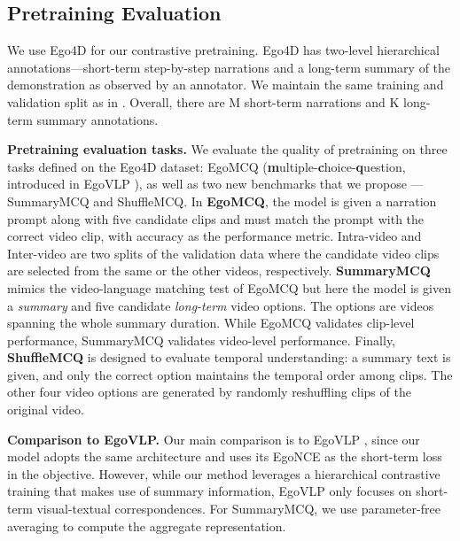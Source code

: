 \documentclass[10pt,twocolumn,letterpaper]{article}
\begin{document}
\subsection{Pretraining Evaluation}
\label{sec:exp-evaluation}

We use Ego4D \cite{ego4d,ego4dcons} for our contrastive pretraining. Ego4D has two-level hierarchical annotations---short-term step-by-step narrations and a long-term summary of the demonstration as observed by an annotator. We maintain the same training and validation split as in \cite{egovlp}. Overall, there are M short-term narrations and K long-term summary annotations. 

\noindent \textbf{Pretraining evaluation tasks.}
We evaluate the quality of pretraining on three tasks defined on the Ego4D dataset: EgoMCQ (\textbf{m}ultiple-\textbf{c}hoice-\textbf{q}uestion, introduced in EgoVLP \cite{egovlp}), as well as two new benchmarks that we propose --- SummaryMCQ and ShuffleMCQ.  In \textbf{EgoMCQ}, the  model is given a narration prompt along with five candidate clips and must match the prompt with the correct video clip, with accuracy as the performance metric. Intra-video and Inter-video are two splits of the validation data where the candidate video clips are selected from the same or the other videos, respectively. \textbf{SummaryMCQ} mimics the video-language matching test of EgoMCQ but here the model is given a \emph{summary} and five candidate \emph{long-term} video options. The options are videos spanning the whole summary duration. While EgoMCQ validates clip-level performance, SummaryMCQ validates video-level performance. Finally, \textbf{ShuffleMCQ} is designed to evaluate temporal understanding: a summary text is given, and only the correct option maintains the temporal order among clips. The other four video options are generated by randomly reshuffling clips of the original video.


\noindent \textbf{Comparison to EgoVLP.} Our main comparison is to EgoVLP \cite{egovlp}, since our model adopts the same architecture and uses its EgoNCE as the short-term loss in the objective.
However, while our method leverages a hierarchical contrastive training that makes use of summary information, EgoVLP only focuses on short-term visual-textual correspondences. For SummaryMCQ, we use parameter-free averaging to compute the aggregate representation. 
\end{document}
